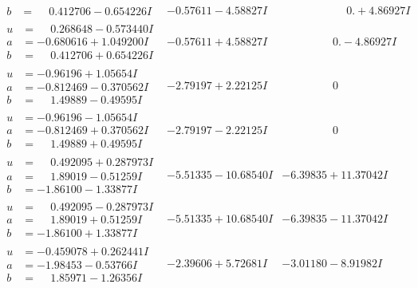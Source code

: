 \documentclass[1p]{elsarticle_modified}
\theoremstyle{definition}
\begin{document}
$$\begin{array}{c|c|c}
\begin{aligned}
b &= \phantom{-}0.412706 - 0.654226 I\end{aligned}
 & -0.57611 - 4.58827 I & \phantom{-0.000000 -}0. + 4.86927 I \\ \hline\begin{aligned}
u &= \phantom{-}0.268648 - 0.573440 I \\
a &= -0.680616 + 1.049200 I \\
b &= \phantom{-}0.412706 + 0.654226 I\end{aligned}
 & -0.57611 + 4.58827 I & \phantom{-0.000000 } 0. - 4.86927 I \\ \hline\begin{aligned}
u &= -0.96196 + 1.05654 I \\
a &= -0.812469 - 0.370562 I \\
b &= \phantom{-}1.49889 - 0.49595 I\end{aligned}
 & -2.79197 + 2.22125 I & \phantom{-0.000000 } 0 \\ \hline\begin{aligned}
u &= -0.96196 - 1.05654 I \\
a &= -0.812469 + 0.370562 I \\
b &= \phantom{-}1.49889 + 0.49595 I\end{aligned}
 & -2.79197 - 2.22125 I & \phantom{-0.000000 } 0 \\ \hline\begin{aligned}
u &= \phantom{-}0.492095 + 0.287973 I \\
a &= \phantom{-}1.89019 - 0.51259 I \\
b &= -1.86100 - 1.33877 I\end{aligned}
 & -5.51335 - 10.68540 I & -6.39835 + 11.37042 I \\ \hline\begin{aligned}
u &= \phantom{-}0.492095 - 0.287973 I \\
a &= \phantom{-}1.89019 + 0.51259 I \\
b &= -1.86100 + 1.33877 I\end{aligned}
 & -5.51335 + 10.68540 I & -6.39835 - 11.37042 I \\ \hline\begin{aligned}
u &= -0.459078 + 0.262441 I \\
a &= -1.98453 - 0.53766 I \\
b &= \phantom{-}1.85971 - 1.26356 I\end{aligned}
 & -2.39606 + 5.72681 I & -3.01180 - 8.91982 I \\ \hline\begin{aligned}

\end{aligned}
\end{array}$$
\end{document}
